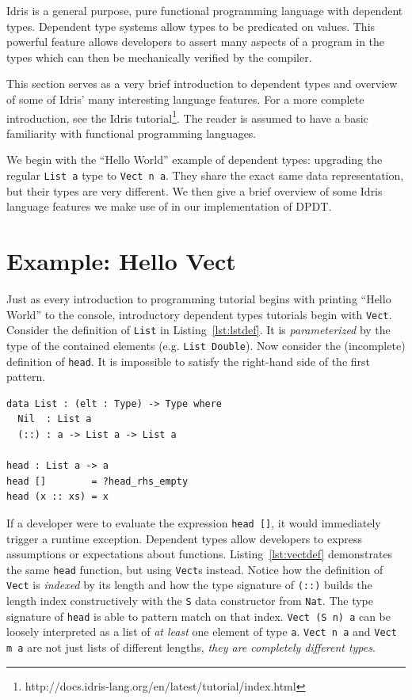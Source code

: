 \documentclass[12pt]{report}
\begin{document}
Idris is a general purpose, pure functional programming language with dependent types.
Dependent type systems allow types to be predicated on values.
This powerful feature allows developers to assert many aspects of a program in the types which can then be mechanically verified by the compiler.

This section serves as a very brief introduction to dependent types and overview of some of Idris' many interesting language features.
For a more complete introduction, see the Idris tutorial\footnote{http://docs.idris-lang.org/en/latest/tutorial/index.html}.
The reader is assumed to have a basic familiarity with functional programming languages.

We begin with the ``Hello World'' example of dependent types: upgrading the regular \texttt{List a} type to \texttt{Vect n a}.
They share the exact same data representation, but their types are very different.
We then give a brief overview of some Idris language features we make use of in our implementation of DPDT.

\section{Example: Hello Vect}

Just as every introduction to programming tutorial begins with printing ``Hello World'' to the console, introductory dependent types tutorials begin with \texttt{Vect}.
Consider the definition of \texttt{List} in Listing~\ref{lst:lstdef}.
It is \textit{parameterized} by the type of the contained elements (e.g. \texttt{List Double}).
Now consider the (incomplete) definition of \texttt{head}.
It is impossible to satisfy the right-hand side of the first pattern.

\begin{lstlisting}[caption={List Definition},label={lst:listdef}]
data List : (elt : Type) -> Type where
  Nil  : List a
  (::) : a -> List a -> List a

head : List a -> a
head []        = ?head_rhs_empty
head (x :: xs) = x
\end{lstlisting}

If a developer were to evaluate the expression \texttt{head []}, it would immediately trigger a runtime exception.
Dependent types allow developers to express assumptions or expectations about functions.
Listing~\ref{lst:vectdef} demonstrates the same \texttt{head} function, but using \texttt{Vect}s instead.
Notice how the definition of \texttt{Vect} is \textit{indexed} by its length and how the type signature of \texttt{(::)} builds the length index constructively with the \texttt{S} data constructor from \texttt{Nat}.
The type signature of \texttt{head} is able to pattern match on that index.
\texttt{Vect (S n) a} can be loosely interpreted as a list of \textit{at least} one element of type \texttt{a}.
\texttt{Vect n a} and \texttt{Vect m a} are not just lists of different lengths, \textit{they are completely different types}.
\end{document}
